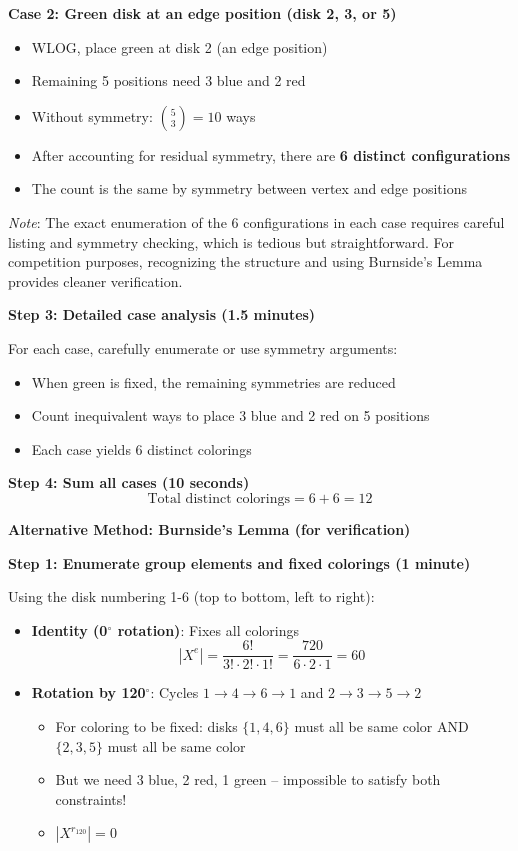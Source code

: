 \documentclass[11pt]{article}
\begin{document}
\begin{solutionbox}
\textbf{Case 2: Green disk at an edge position (disk 2, 3, or 5)}
\begin{itemize}
    \item WLOG, place green at disk 2 (an edge position)
    \item Remaining 5 positions need 3 blue and 2 red
    \item Without symmetry: $\binom{5}{3} = 10$ ways
    \item After accounting for residual symmetry, there are \textbf{6 distinct configurations}
    \item The count is the same by symmetry between vertex and edge positions
\end{itemize}

\textit{Note}: The exact enumeration of the 6 configurations in each case requires careful listing and symmetry checking, which is tedious but straightforward. For competition purposes, recognizing the structure and using Burnside's Lemma provides cleaner verification.

\textbf{Step 3: Detailed case analysis (1.5 minutes)}

For each case, carefully enumerate or use symmetry arguments:
\begin{itemize}
    \item When green is fixed, the remaining symmetries are reduced
    \item Count inequivalent ways to place 3 blue and 2 red on 5 positions
    \item Each case yields 6 distinct colorings
\end{itemize}

\textbf{Step 4: Sum all cases (10 seconds)}
\[
\text{Total distinct colorings} = 6 + 6 = 12
\]

\textbf{Alternative Method: Burnside's Lemma (for verification)}

\textbf{Step 1: Enumerate group elements and fixed colorings (1 minute)}

Using the disk numbering 1-6 (top to bottom, left to right):

\begin{itemize}
    \item \textbf{Identity (0$^\circ$ rotation)}: Fixes all colorings
    \[|X^{e}| = \frac{6!}{3! \cdot 2! \cdot 1!} = \frac{720}{6 \cdot 2 \cdot 1} = 60\]
    
    \item \textbf{Rotation by 120$^\circ$}: Cycles $1 \to 4 \to 6 \to 1$ and $2 \to 3 \to 5 \to 2$
    \begin{itemize}
        \item For coloring to be fixed: disks $\{1,4,6\}$ must all be same color AND $\{2,3,5\}$ must all be same color
        \item But we need 3 blue, 2 red, 1 green -- impossible to satisfy both constraints!
        \item $|X^{r_{120}}| = 0$
    \end{itemize}
    

\end{itemize}
\end{solutionbox}
\end{document}
